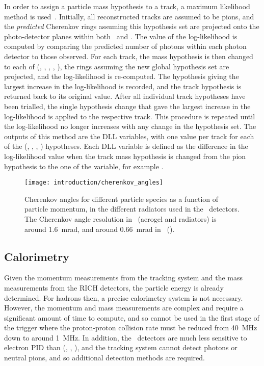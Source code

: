 In order to assign a particle mass hypothesis to a track, a maximum likelihood 
method is used~\cite{Forty:1998eqa}.
Initially, all reconstructed tracks are assumed to be pions, and the 
\emph{predicted} Cherenkov rings assuming this hypothesis set are projected 
onto the photo-detector planes within both \richone\ and \richtwo.
The value of the log-likelihood is computed by comparing the predicted number 
of photons within each photon detector to those observed.
For each track, the mass hypothesis is then changed to each of (\Pe, \Pmu, 
\Ppi, \PK, \Pproton), the rings assuming the new global hypothesis set are 
projected, and the log-likelihood is re-computed.
The hypothesis giving the largest increase in the log-likelihood is recorded, 
and the track hypothesis is returned back to its original value.
After all individual track hypotheses have been trialled, the single hypothesis 
change that gave the largest increase in the log-likelihood is applied to the 
respective track.
This procedure is repeated until the log-likelihood no longer increases with 
any change in the hypothesis set.
The outputs of this method are the \ac{DLL} variables, with one value per track 
for each of the (\Pe, \Pmu, \PK, \Pproton) hypotheses.
Each \ac{DLL} variable is defined as the difference in the log-likelihood value 
when the track mass hypothesis is changed from the pion hypothesis to the one 
of the variable, for example \dllkpi.

\begin{figure}
  \centering
  \texttt{[image: introduction/cherenkov\_angles]}
  \caption{%
    Cherenkov angles for different particle species as a function of particle 
    momentum, in the different radiators used in the \rich\ detectors.
    The Cherenkov angle resolution in \richone~(aerogel and  
    radiators) is around \SI{1.6}{\milli\radian}, and around 
    \SI{0.66}{\milli\radian} in \richtwo~().
  }
  \label{fig:intro:lhcb:cherenkov_angles}
\end{figure}

\subsection{Calorimetry}
\label{chap:intro:lhcb:detector:calo}

Given the momentum measurements from the tracking system and the mass 
measurements from the \ac{RICH} detectors, the particle energy is already 
determined.
For hadrons then, a precise calorimetry system is not necessary.
However, the momentum and mass measurements are complex and require a 
significant amount of time to compute, and so cannot be used in the first stage 
of the trigger where the proton-proton collision rate must be reduced from 
\SI{40}{\mega\hertz} down to around \SI{1}{\mega\hertz}.
In addition, the \rich\ detectors are much less sensitive to electron \ac{PID} 
than (\Pe, \Pmu, \Pproton), and the tracking system cannot detect photons or 
neutral pions, and so additional detection methods are required.


